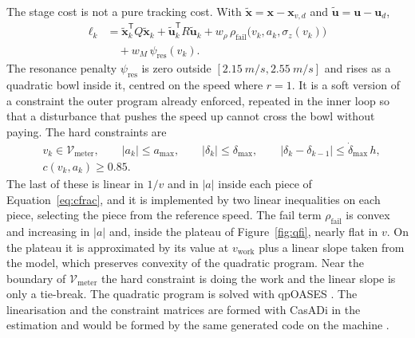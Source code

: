 The stage cost is not a pure tracking cost. With \(\tilde{\mathbf{x}}=\mathbf{x}-\mathbf{x}_{v,d}\) and \(\tilde{\mathbf{u}}=\mathbf{u}-\mathbf{u}_d\),
\begin{equation}
\label{eq:stage}
\begin{aligned}
\ell_k &= \tilde{\mathbf{x}}_k^{\mathsf{T}} Q \tilde{\mathbf{x}}_k + \tilde{\mathbf{u}}_k^{\mathsf{T}} R \tilde{\mathbf{u}}_k + w_{\rho}\,\rho_{\mathrm{fail}}\bigl(v_k,a_k,\sigma_z(v_k)\bigr) \\
&\quad + w_{M}\,\psi_{\mathrm{res}}(v_k).
\end{aligned}
\end{equation}
The resonance penalty \(\psi_{\mathrm{res}}\) is zero outside \([\SI{2.15}{m/s},\SI{2.55}{m/s}]\) and rises as a quadratic bowl inside it, centred on the speed where \(r=1\). It is a soft version of a constraint the outer program already enforced, repeated in the inner loop so that a disturbance that pushes the speed up cannot cross the bowl without paying. The hard constraints are
\begin{equation}
\label{eq:hard}
\begin{aligned}
&v_k \in \mathcal{V}_{\mathrm{meter}},\qquad
|a_k| \le a_{\max},\qquad
|\delta_k| \le \delta_{\max},\qquad
|\delta_k-\delta_{k-1}| \le \dot{\delta}_{\max}\, h,\\
&c(v_k,a_k) \ge 0.85.
\end{aligned}
\end{equation}
The last of these is linear in \(1/v\) and in \(|a|\) inside each piece of Equation~\eqref{eq:cfrac}, and it is implemented by two linear inequalities on each piece, selecting the piece from the reference speed. The fail term \(\rho_{\mathrm{fail}}\) is convex and increasing in \(|a|\) and, inside the plateau of Figure~\ref{fig:qfi}, nearly flat in \(v\). On the plateau it is approximated by its value at \(v_{\mathrm{work}}\) plus a linear slope taken from the model, which preserves convexity of the quadratic program. Near the boundary of \(\mathcal{V}_{\mathrm{meter}}\) the hard constraint is doing the work and the linear slope is only a tie-break. The quadratic program is solved with qpOASES \cite{ferreau2014}. The linearisation and the constraint matrices are formed with CasADi in the estimation and would be formed by the same generated code on the machine \cite{andersson2019}.

